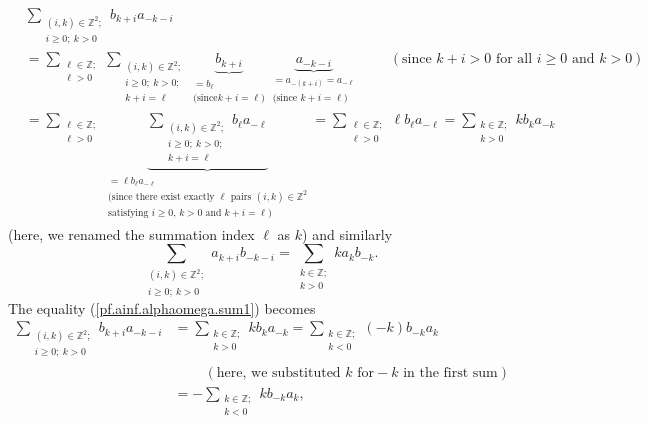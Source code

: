 \documentclass[etingof-lie.tex]{subfiles}
\begin{document}
\begin{align}
&  \sum\limits_{\substack{\left(  i,k\right)  \in\mathbb{Z}^{2};\\i\geq
0;\ k>0}}b_{k+i}a_{-k-i}\nonumber\\
&  =\sum\limits_{\substack{\ell\in\mathbb{Z};\\\ell>0}}\sum
\limits_{\substack{\left(  i,k\right)  \in\mathbb{Z}^{2};\\i\geq
0;\ k>0;\\k+i=\ell}}\underbrace{b_{k+i}}_{\substack{=b_{\ell}\\\text{(since
}k+i=\ell\text{)}}}\underbrace{a_{-k-i}}_{\substack{=a_{-\left(  k+i\right)
}=a_{-\ell}\\\text{(since }k+i=\ell\text{)}}}\ \ \ \ \ \ \ \ \ \ \left(
\text{since }k+i>0\text{ for all }i\geq0\text{ and }k>0\right) \nonumber\\
&  =\sum\limits_{\substack{\ell\in\mathbb{Z};\\\ell>0}}\underbrace{\sum
\limits_{\substack{\left(  i,k\right)  \in\mathbb{Z}^{2};\\i\geq
0;\ k>0;\\k+i=\ell}}b_{\ell}a_{-\ell}}_{\substack{=\ell b_{\ell}a_{-\ell
}\\\text{(since there exist exactly }\ell\text{ pairs }\left(  i,k\right)
\in\mathbb{Z}^{2}\\\text{satisfying }i\geq0\text{, }k>0\text{ and }%
k+i=\ell\text{)}}}=\sum\limits_{\substack{\ell\in\mathbb{Z};\\\ell>0}}\ell
b_{\ell}a_{-\ell}=\sum\limits_{\substack{k\in\mathbb{Z};\\k>0}}kb_{k}a_{-k}
\label{pf.ainf.alphaomega.sum1}%
\end{align}
(here, we renamed the summation index $\ell$ as $k$) and similarly
\begin{equation}
\sum\limits_{\substack{\left(  i,k\right)  \in\mathbb{Z}^{2};\\i\geq
0;\ k>0}}a_{k+i}b_{-k-i}=\sum\limits_{\substack{k\in\mathbb{Z};\\k>0}%
}ka_{k}b_{-k}. \label{pf.ainf.alphaomega.sum2}%
\end{equation}
The equality (\ref{pf.ainf.alphaomega.sum1}) becomes%
\begin{align*}
\sum\limits_{\substack{\left(  i,k\right)  \in\mathbb{Z}^{2};\\i\geq
0;\ k>0}}b_{k+i}a_{-k-i}  &  =\sum\limits_{\substack{k\in\mathbb{Z}%
;\\k>0}}kb_{k}a_{-k}=\sum\limits_{\substack{k\in\mathbb{Z};\\k<0}}\left(
-k\right)  b_{-k}a_{k}\\
&  \ \ \ \ \ \ \ \ \ \ \left(  \text{here, we substituted }k\text{ for
}-k\text{ in the first sum}\right) \\
&  =-\sum\limits_{\substack{k\in\mathbb{Z};\\k<0}}kb_{-k}a_{k},
\end{align*}
\end{document}
